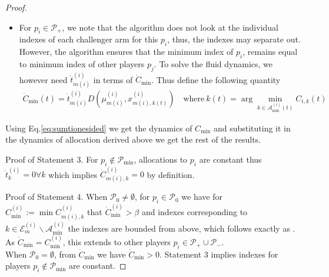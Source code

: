 \documentclass{article}
\begin{document}
\begin{proof}
\begin{itemize}
    Using $\dot{g}_i=0$, we get
    \begin{align*}
        \dot{t}^{(i)}_{m(i)}\sum h^{(i)}_kt^{(i)}_k- \sum \dot{t}^{(i)}_{k}f^{(i)}_kh^{(i)}_kt^{(i)}_{m(i)}=0
    \end{align*}
Finally
    \begin{align*}
          \dot{t}^{(i)}_k =   \dot{t}^{(i)}_{m(i)}\dfrac{h^{(i)}_{\texttt{w}}/D^{(i)}_{k,k}+t^{(i)}_{k}h^{(i)}_{\min}}{t^{(i)}_{m(i)}h^{(i)}_{\min}}
    \end{align*}
    By definition, we have
    \begin{align*}
        \dot{C}_{\min}&= \dot{t}^{(i)}_{m(i)}D(\mu^{(i)}_{m(i)},x^{(i)}_{m(i),k}) + \dot{t}^{(i)}_kD(\mu^{(i)}_k,x^{(i)}_{m(i),k})\\
        &=\dot{t}^{(i)}_{m(i)}\left(  \dfrac{C_{\min}h^{(i)}_{\min}+h^{(i)}_{\texttt{w}}}{t^{(i)}_{m(i)}h^{(i)}_{\min}}\right)
    \end{align*}
      \item   For $p_i\in\mathcal{P}_{+}$, we note that the algorithm does not look at the individual indexes of each challenger arm for this $p_i$, thus, the indexes may separate out. However, the algorithm ensures that the minimum index of $p_i$, remains equal to minimum index of other players $p_j$. To solve the fluid dynamics, we however need $\dot{t}^{(i)}_{m(i)}$ in terms of $\dot{C}_{\min}$. Thus define the following quantity 
    \begin{align*}
        \dot{C}_{\min}(t) = \dot{t}^{(i)}_{m(i)}D(\mu^{(i)}_{m(i)},x^{(i)}_{m(i),k(t)})\quad \text{where}\  k(t)=\arg\min_{k\in\mathcal{A}^{(i)}_{\min}(t)}C_{i,k}(t)\tag{$ \forall t\in [t_0,t_1)$}
    \end{align*}
    \end{itemize}
    Using Eq.\ref{eq:sumtionesided} we get the dynamics of $C_{\min}$ and substituting it in the dynamics of allocation derived above we get the rest of the results.

    Proof of Statement 3. For $p_i\not\in\mathcal{P}_{\min}$, allocations to $p_i$ are constant thus $\dot{t}^{(i)}_k=0 \forall k$ which implies $\dot{C}^{(i)}_{m(i),k}=0$ by definition.

    Proof of Statement 4. When $\mathcal{P}_{0}\neq \emptyset$, for $p_i\in\mathcal{P}_{0}$ we have for $C^{(i)}_{\min}:=\min C^{(i)}_{m(i),k}$ that $\dot{C}^{(i)}_{\min}>\beta$ and indexes corresponding to $k\in\mathcal{E}^{(i)}_m\backslash\mathcal{A}_{\min}^{(i)}$ the indexes are bounded from above, which follows exactly as \cite[Lemma E.1., E.2., E.3.]{bandyopadhyay2024optimal}. As $\dot{C}_{\min}=C^{(i)}_{\min}$, this extends to other players $p_i\in \mathcal{P}_+\cup\mathcal{P}_-$.\\
    When $\mathcal{P}_{0}=\emptyset$, from $\dot{C}_{\min}$ we have $\dot{C}_{\min}>0$. Statement 3 implies indexes for players $p_i\not\in\mathcal{P}_{\min}$ are constant. 
\end{proof}
\end{document}
